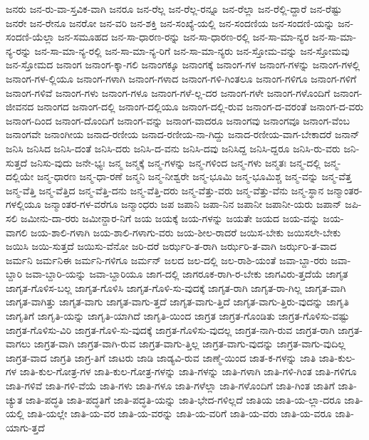 {ಜನರು
ಜನ-ರು-ವಾ-ಸ್ತವಿಕ-ವಾಗಿ
ಜನರೂ
ಜನ-ರೆಲ್ಲ
ಜನ-ರೆಲ್ಲ-ರನ್ನೂ
ಜನ-ರೆಲ್ಲಾ
ಜನ-ರೆಲ್ಲಿ-ದ್ದಾರೆ
ಜನ-ರೆಷ್ಟು
ಜನರೇ
ಜನ-ರೇನೂ
ಜನರೋ
ಜನ-ವರಿ
ಜನ-ಶಕ್ತಿ
ಜನ-ಸಂಖ್ಯೆ-ಯಲ್ಲಿ
ಜನ-ಸಂದಣಿಯ
ಜನ-ಸಂದಣಿ-ಯನ್ನು
ಜನ-ಸಂದಣಿ-ಯೆಲ್ಲಾ
ಜನ-ಸಮೂಹದ
ಜನ-ಸಾ-ಧಾರಣ-ರನ್ನು
ಜನ-ಸಾ-ಧಾರಣ-ರಲ್ಲಿ
ಜನ-ಸಾ-ಮಾ-ನ್ಯರ
ಜನ-ಸಾ-ಮಾ-ನ್ಯ-ರನ್ನು
ಜನ-ಸಾ-ಮಾ-ನ್ಯ-ರಲ್ಲಿ
ಜನ-ಸಾ-ಮಾ-ನ್ಯ-ರಿಗೆ
ಜನ-ಸಾ-ಮಾ-ನ್ಯರು
ಜನ-ಸ್ತೋಮ-ವನ್ನು
ಜನ-ಸ್ತೋಮವು
ಜನ-ಸ್ತೋಮದ
ಜನಾಂಗ
ಜನಾಂಗ-ಕ್ಕಾ-ಗಲಿ
ಜನಾಂಗಕ್ಕೂ
ಜನಾಂಗಕ್ಕೆ
ಜನಾಂಗ-ಗಳ
ಜನಾಂಗ-ಗಳನ್ನು
ಜನಾಂಗ-ಗಳಲ್ಲಿ
ಜನಾಂಗ-ಗಳ-ಲ್ಲಿಯೂ
ಜನಾಂಗ-ಗಳಾಗಿ
ಜನಾಂಗ-ಗಳಾದ
ಜನಾಂಗ-ಗಳಿ-ಗಿಂತಲೂ
ಜನಾಂಗ-ಗಳಿಗೂ
ಜನಾಂಗ-ಗಳಿಗೆ
ಜನಾಂಗ-ಗಳಿವೆ
ಜನಾಂಗ-ಗಳು
ಜನಾಂಗ-ಗಳೂ
ಜನಾಂಗ-ಗಳೆ-ಲ್ಲ-ದರ
ಜನಾಂಗ-ಗಳೇ
ಜನಾಂಗ-ಗಳೊಂದಿಗೆ
ಜನಾಂಗ-ಜೀವನದ
ಜನಾಂಗದ
ಜನಾಂಗ-ದಲ್ಲಿ
ಜನಾಂಗ-ದಲ್ಲಿಯೂ
ಜನಾಂಗ-ದಲ್ಲಿ-ರುವ
ಜನಾಂಗ-ದ-ವರಂತೆ
ಜನಾಂಗ-ದ-ವರು
ಜನಾಂಗ-ದಿಂದ
ಜನಾಂಗ-ದೊಂದಿಗೆ
ಜನಾಂಗ-ವನ್ನು
ಜನಾಂಗ-ವಾದರೂ
ಜನಾಂಗವು
ಜನಾಂಗವೂ
ಜನಾಂಗ-ವೆಂಬ
ಜನಾಂಗವೇ
ಜನಾಂಗೀಯ
ಜನಾದ-ರಣೀಯ
ಜನಾದ-ರಣೀಯ-ನಾ-ಗಿದ್ದು
ಜನಾದ-ರಣೀಯ-ವಾಗ-ಬೇಕಾದರೆ
ಜನಾನ್
ಜನಿಸಿ
ಜನಿಸಿದ
ಜನಿಸಿ-ದಂತೆ
ಜನಿಸಿ-ದರು
ಜನಿಸಿ-ದ-ವನು
ಜನಿಸಿ-ದವು
ಜನಿಸಿದ್ದ
ಜನಿಸಿ-ದ್ದರೂ
ಜನಿಸಿ-ರು-ವರು
ಜನಿ-ಸುತ್ತದೆ
ಜನಿಸು-ವುದು
ಜನೇ-ಭ್ಯಃ
ಜನ್ಮ
ಜನ್ಮಕ್ಕೆ
ಜನ್ಮ-ಗಳನ್ನು
ಜನ್ಮ-ಗಳಿಂದ
ಜನ್ಮ-ಗಳು
ಜನ್ಮತಃ
ಜನ್ಮ-ದಲ್ಲಿ
ಜನ್ಮ-ದಲ್ಲಿಯೇ
ಜನ್ಮ-ಧಾರಣ
ಜನ್ಮ-ಧಾ-ರಣೆ
ಜನ್ಮನಿ
ಜನ್ಮ-ನೀಶ್ವರೇ
ಜನ್ಮ-ಭೂಮಿ
ಜನ್ಮ-ಭೂಮಿಶ್ಚ
ಜನ್ಮ-ವನ್ನು
ಜನ್ಮ-ವೆತ್ತ
ಜನ್ಮ-ವೆತ್ತಿ
ಜನ್ಮ-ವೆತ್ತಿದ
ಜನ್ಮ-ವೆತ್ತಿ-ದನು
ಜನ್ಮ-ವೆತ್ತಿ-ದರು
ಜನ್ಮ-ವೆತ್ತು-ವರು
ಜನ್ಮ-ವೆತ್ತು-ವೆನು
ಜನ್ಮ-ಸ್ಥಾನ
ಜನ್ಮಾಂತರ-ಗಳಲ್ಲಿಯೂ
ಜನ್ಮಾಂತರ-ಗಳ-ವರೆಗೂ
ಜನ್ಮಾಂಧರು
ಜಪ
ಜಪಾನಿ
ಜಪಾ-ನಿನ
ಜಪಾನೀ
ಜಪಾನೀ-ಯರು
ಜಪಾನ್
ಜಪಿ-ಸಲಿ
ಜಮೀನು-ದಾ-ರರು
ಜಮೀನ್ದಾರ-ನಿಗೆ
ಜಯ
ಜಯಕ್ಕೆ
ಜಯ-ಗಳನ್ನು
ಜಯತೇ
ಜಯದ
ಜಯ-ವನ್ನು
ಜಯ-ವಾಗಲಿ
ಜಯ-ಶಾಲಿ-ಗಳಾಗಿ
ಜಯ-ಶಾಲಿ-ಗಳಾಗು-ವರು
ಜಯ-ಶೀಲ-ರಾದರೆ
ಜಯಿಸ-ಬೇಕು
ಜಯಿಸಲೇ-ಬೇಕು
ಜಯಿಸಿ
ಜಯಿ-ಸುತ್ತದೆ
ಜಯಿಸು-ವೆನೋ
ಜರಿ-ದರೆ
ಜರ್ಝರಿ-ತ-ರಾಗಿ
ಜರ್ಝರಿ-ತ-ವಾಗಿ
ಜರ್ಝರಿ-ತ-ವಾದ
ಜರ್ಮನಿ
ಜರ್ಮನಿಈ
ಜರ್ಮನಿ-ಗಳಿಗೂ
ಜರ್ಮನ್
ಜಲದ
ಜಲ-ದಲ್ಲಿ
ಜಲ-ರಾಶಿ-ಯಂತೆ
ಜವಾ-ಬ್ದಾ-ರರು
ಜವಾ-ಬ್ದಾರಿ
ಜವಾ-ಬ್ದಾರಿ-ಯನ್ನು
ಜವಾ-ಬ್ದಾರಿಯೂ
ಜಾಗ-ದಲ್ಲಿ
ಜಾಗರೂಕ-ರಾಗಿ-ರ-ಬೇಕು
ಜಾಗವಿರು-ತ್ತದೆಯೆ
ಜಾಗೃತ
ಜಾಗೃತ-ಗೊಳಿಸ-ಬಲ್ಲ
ಜಾಗೃತ-ಗೊಳಿಸಿ
ಜಾಗೃತ-ಗೊಳಿ-ಸು-ವುದಕ್ಕೆ
ಜಾಗೃತ-ರಾಗಿ
ಜಾಗೃತ-ರಾ-ಗಿಲ್ಲ
ಜಾಗೃತ-ವಾಗಿ
ಜಾಗೃತ-ವಾಗಿತ್ತು
ಜಾಗೃತ-ವಾಗು
ಜಾಗೃತ-ವಾಗು-ತ್ತದೆ
ಜಾಗೃತ-ವಾಗು-ತ್ತಿದೆ
ಜಾಗೃತ-ವಾಗು-ತ್ತಿರು-ವುದನ್ನು
ಜಾಗೃತಿ
ಜಾಗೃತಿಗೆ
ಜಾಗೃತಿ-ಯನ್ನು
ಜಾಗೃತಿ-ಯಾಗಿದೆ
ಜಾಗೃತಿ-ಯಿಂದ
ಜಾಗ್ರತ
ಜಾಗ್ರತ-ಗೊಂಡಿತು
ಜಾಗ್ರತ-ಗೊಳಿಸು-ವಷ್ಟು
ಜಾಗ್ರತ-ಗೊಳಿಸು-ವಿರಿ
ಜಾಗ್ರತ-ಗೊಳಿ-ಸು-ವುದಕ್ಕೆ
ಜಾಗ್ರತ-ಗೊಳಿಸು-ವುದಲ್ಲ
ಜಾಗ್ರತ-ನಾಗಿ-ರುವ
ಜಾಗ್ರತ-ರಾಗಿ
ಜಾಗ್ರತ-ವಾಗಲು
ಜಾಗ್ರತ-ವಾಗಿ
ಜಾಗ್ರತ-ವಾಗಿ-ರುವ
ಜಾಗ್ರತ-ವಾಗು-ತ್ತಿಲ್ಲ
ಜಾಗ್ರತ-ವಾಗು-ವುದನ್ನು
ಜಾಗ್ರತ-ವಾಗು-ವುದಿಲ್ಲ
ಜಾಗ್ರತ-ವಾದ
ಜಾಗ್ರತಿ
ಜಾಗ್ರ-ತಿಗೆ
ಜಾಟರು
ಜಾಡಿ
ಜಾಡ್ಯವಿ-ರುವ
ಜಾಣ್ಮೆ-ಯಿಂದ
ಜಾತ-ಕ-ಗಳನ್ನು
ಜಾತಿ
ಜಾತಿ-ಕುಲ-ಗಳ
ಜಾತಿ-ಕುಲ-ಗೋತ್ರ-ಗಳ
ಜಾತಿ-ಕುಲ-ಗೋತ್ರ-ಗಳನ್ನು
ಜಾತಿ-ಗಳನ್ನು
ಜಾತಿ-ಗಳಾಗಿ
ಜಾತಿ-ಗಳಿ-ಗಿಂತ
ಜಾತಿ-ಗಳಿಗೂ
ಜಾತಿ-ಗಳಿವೆ
ಜಾತಿ-ಗಳಿ-ವೆಯೆ
ಜಾತಿ-ಗಳು
ಜಾತಿ-ಗಳೂ
ಜಾತಿ-ಗಳೆಲ್ಲಾ
ಜಾತಿ-ಗಳೊಂದಿಗೆ
ಜಾತಿ-ಗಿಂತ
ಜಾತಿಗೆ
ಜಾತಿ-ಚ್ಯುತ
ಜಾತಿ-ಪದ್ಧತಿ
ಜಾತಿ-ಪದ್ಧತಿಗೆ
ಜಾತಿ-ಪದ್ಧತಿ-ಯನ್ನು
ಜಾತಿ-ಭೇದ-ಗಳಿಲ್ಲದೆ
ಜಾತಿಯ
ಜಾತಿ-ಯ-ಲ್ಲಾ-ದರೂ
ಜಾತಿ-ಯಲ್ಲಿ
ಜಾತಿ-ಯಲ್ಲೇ
ಜಾತಿ-ಯ-ವರ
ಜಾತಿ-ಯ-ವರನ್ನು
ಜಾತಿ-ಯ-ವರಿಗೆ
ಜಾತಿ-ಯ-ವರು
ಜಾತಿ-ಯ-ವರೂ
ಜಾತಿ-ಯಾಗು-ತ್ತದೆ
}

